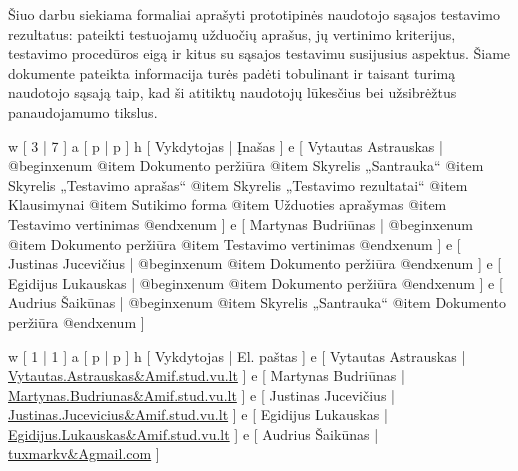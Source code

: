
Šiuo darbu siekiama formaliai aprašyti prototipinės naudotojo
sąsajos testavimo rezultatus: pateikti testuojamų užduočių
aprašus, jų vertinimo kriterijus, testavimo procedūros eigą ir kitus
su sąsajos testavimu susijusius aspektus. Šiame dokumente pateikta
informacija turės padėti tobulinant ir taisant turimą naudotojo
sąsają taip, kad ši atitiktų naudotojų lūkesčius bei
užsibrėžtus panaudojamumo tikslus.

\xtable
{
  w [ 3  | 7 ]
  a [ p  | p ]
  h [ Vykdytojas | Įnašas ]
  e [ Vytautas Astrauskas
  | @begin{xenum} 
      @item Dokumento peržiūra
      @item Skyrelis „Santrauka“
      @item Skyrelis „Testavimo aprašas“
      @item Skyrelis „Testavimo rezultatai“
      @item Klausimynai
      @item Sutikimo forma
      @item Užduoties aprašymas
      @item Testavimo vertinimas
    @end{xenum}
  ]
  e [ Martynas Budriūnas
  | @begin{xenum} 
      @item Dokumento peržiūra
      @item Testavimo vertinimas
    @end{xenum}
  ]
  e [ Justinas Jucevičius 
  | @begin{xenum} 
      @item Dokumento peržiūra
    @end{xenum}
  ]
  e [ Egidijus Lukauskas 
  | @begin{xenum} 
      @item Dokumento peržiūra
    @end{xenum}
  ]
  e [ Audrius Šaikūnas 
  | @begin{xenum} 
      @item Skyrelis „Santrauka“
      @item Dokumento peržiūra
    @end{xenum}
  ]
}

\xtableu
{
  w [ 1 | 1 ]
  a [ p | p ]
  h [ Vykdytojas | El. paštas ]
  e [ Vytautas Astrauskas | \url{Vytautas.Astrauskas&Amif.stud.vu.lt} ]
  e [ Martynas Budriūnas  | \url{Martynas.Budriunas&Amif.stud.vu.lt} ]
  e [ Justinas Jucevičius | \url{Justinas.Jucevicius&Amif.stud.vu.lt} ]
  e [ Egidijus Lukauskas  | \url{Egidijus.Lukauskas&Amif.stud.vu.lt} ]
  e [ Audrius Šaikūnas    | \url{tuxmarkv&Agmail.com} ]
}
